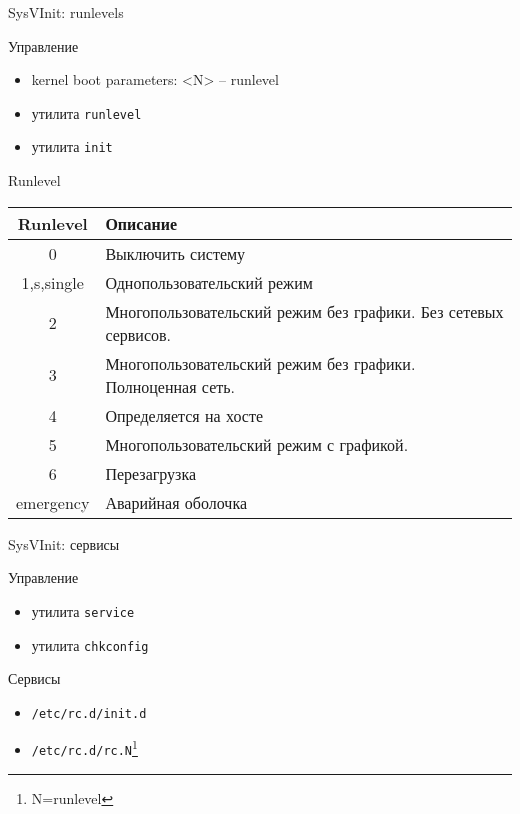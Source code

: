 \begin{frame}{SysVInit: runlevels}
	\begin{block}{Управление}
		\begin{itemize}
			\item kernel boot parameters: <N> -- runlevel
			\item утилита {\tt runlevel}
			\item утилита {\tt init}
		\end{itemize}
	\end{block}

	\scriptsize
	\begin{block}{Runlevel}
		\begin{table}
			\begin{tabular}{c | l }
			\hline
			Runlevel & Описание\\
			\hline
			0	& Выключить систему \\
			1,s,single & Однопользовательский режим \\
			2	& Многопользовательский режим без графики. Без сетевых сервисов.\\
			3	& Многопользовательский режим без графики. Полноценная сеть. \\
			4	& Определяется на хосте\\
			5	& Многопользовательский режим с графикой.\\
			6	& Перезагрузка\\
			emergency & Аварийная оболочка \\
			\hline
			\end{tabular}
		\end{table}
	\end{block}
\end{frame}

\begin{frame}{SysVInit: сервисы}
	\begin{block}{Управление}
		\begin{itemize}
			\item утилита {\tt service}
			\item утилита {\tt chkconfig}
		\end{itemize}
	\end{block}

	\begin{block}{Сервисы}
		\begin{itemize}
			\item {\tt /etc/rc.d/init.d}
			\item {\tt /etc/rc.d/rc.N}\footnote{N=runlevel}
		\end{itemize}
	\end{block}
\end{frame}

